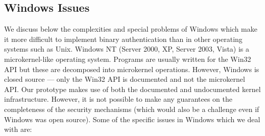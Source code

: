 \subsection{Windows Issues}
\label{sec:binauth-windows}

We discuss below the complexities and special problems of
Windows which make it more difficult to implement binary authentication
than in other operating systems such as Unix.
Windows NT (Server 2000, XP, Server 2003, Vista) is a microkernel-like
operating system. 
Programs are usually written for the Win32 API but these are
decomposed into microkernel operations. 
However, Windows is closed source --- only the Win32 API is documented
and not the microkernel API.
Our prototype makes use of both the documented and undocumented
kernel infrastructure. However, it is not possible to make any guarantees
on the completeness of the security mechanisms
(which would also be a challenge even if Windows was open source).
Some of the specific issues in Windows which we deal with are:
